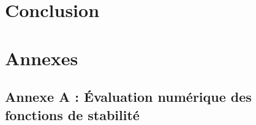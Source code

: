 \documentclass[11pt]{report}
\theoremstyle{definition}
\theoremstyle{remark}
\begin{document}
\chapter{Conclusion}
    
        

\newpage

\printbibliography
{}

\newpage

\appendix
\chapter*{Annexes}
\section*{Annexe A : Évaluation numérique des fonctions de stabilité}



\end{document}
